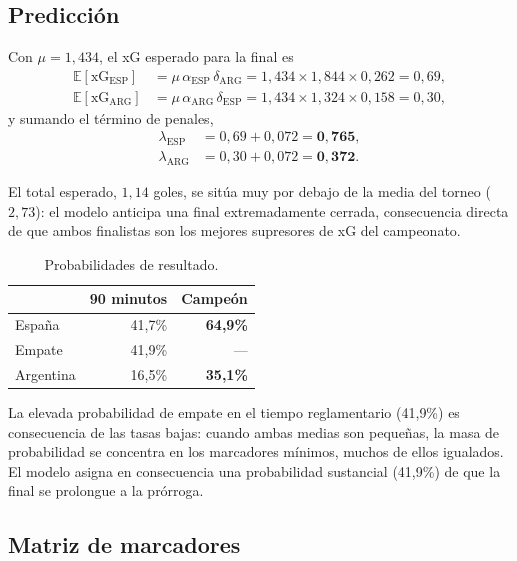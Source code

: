 \documentclass[11pt,a4paper]{article}
\newcommand{\xG}{\mathrm{xG}}
\newcommand{\E}{\mathbb{E}}
\begin{document}
\subsection{Predicción}

Con $\mu = 1{,}434$, el xG esperado para la final es
\begin{align}
\E[\xG_{\text{ESP}}] &= \mu\, \alpha_{\text{ESP}}\, \delta_{\text{ARG}} = 1{,}434 \times 1{,}844 \times 0{,}262 = 0{,}69, \\
\E[\xG_{\text{ARG}}] &= \mu\, \alpha_{\text{ARG}}\, \delta_{\text{ESP}} = 1{,}434 \times 1{,}324 \times 0{,}158 = 0{,}30,
\end{align}
y sumando el término de penales,
\begin{align}
\lambda_{\text{ESP}} &= 0{,}69 + 0{,}072 = \mathbf{0{,}765}, \\
\lambda_{\text{ARG}} &= 0{,}30 + 0{,}072 = \mathbf{0{,}372}.
\end{align}

El total esperado, $1{,}14$ goles, se sitúa muy por debajo de la media del torneo ($2{,}73$): el modelo anticipa una final extremadamente cerrada, consecuencia directa de que ambos finalistas son los mejores supresores de xG del campeonato.

\begin{table}[htbp]
\centering
\caption{Probabilidades de resultado.}
\label{tab:pred}
\begin{tabular}{lrr}
\toprule
& \textbf{90 minutos} & \textbf{Campeón} \\
\midrule
España    & 41{,}7\% & \textbf{64{,}9\%} \\
Empate    & 41{,}9\% & --- \\
Argentina & 16{,}5\% & \textbf{35{,}1\%} \\
\bottomrule
\end{tabular}
\end{table}

La elevada probabilidad de empate en el tiempo reglamentario (41{,}9\%) es consecuencia de las tasas bajas: cuando ambas medias son pequeñas, la masa de probabilidad se concentra en los marcadores mínimos, muchos de ellos igualados. El modelo asigna en consecuencia una probabilidad sustancial (41{,}9\%) de que la final se prolongue a la prórroga.

\subsection{Matriz de marcadores}
\end{document}
